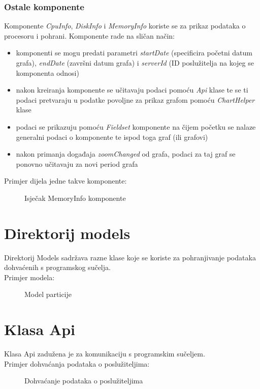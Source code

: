 \documentclass[zavrsnirad]{fer}
\begin{document}
\subsubsection{Ostale komponente}
Komponente \textit{CpuInfo}, \textit{DiskInfo} i \textit{MemoryInfo} koriste se za prikaz podataka o procesoru i pohrani. Komponente rade na sličan način:
\begin{itemize}
	\item komponenti se mogu predati parametri \textit{startDate} (specificira početni datum grafa), \textit{endDate} (završni datum grafa) i \textit{serverId} (ID poslužitelja na kojeg se komponenta odnosi)
	\item nakon kreiranja komponente se učitavaju podaci pomoću \textit{Api} klase te se ti podaci pretvaraju u podatke povoljne za prikaz grafom pomoću \textit{ChartHelper} klase
	\item podaci se prikazuju pomoću \textit{Fieldset} komponente na čijem početku se nalaze generalni podaci o komponente te ispod toga graf (ili grafovi)
	\item nakon primanja događaja \textit{zoomChanged} od grafa, podaci za taj graf se ponovno učitavaju za novi period grafa
\end{itemize}
Primjer dijela jedne takve komponente:
\begin{figure}[htb]
	\centering
	
	\caption{Isječak MemoryInfo komponente}
\end{figure}
\FloatBarrier

\section{Direktorij models}
Direktorij Models sadržava razne klase koje se koriste za pohranjivanje podataka dohvaćenih s programskog sučelja.
\\Primjer modela:
\begin{figure}[htb]
	\centering
	
	\caption{Model particije}
\end{figure}
\FloatBarrier

\section{Klasa Api}
Klasa Api zadužena je za komunikaciju s programskim sučeljem.
\\Primjer dohvaćanja podataka o poslužiteljima:
\begin{figure}[htb]
	\centering
	
	\caption{Dohvaćanje podataka o poslužiteljima}
\end{figure}
\FloatBarrier
\end{document}
